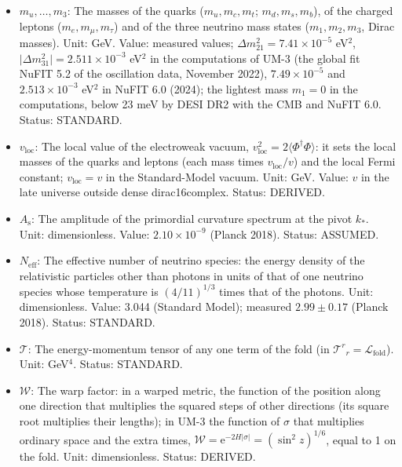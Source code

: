\documentclass[
  10pt,
]{article}
\begin{document}
\begin{itemize}
  space (the three components are equal); a repeated index is not summed
  unless a sum sign is written. Status: STANDARD.
\item
  \(m_u, \dots, m_3\): The masses of the quarks (\(m_u, m_c, m_t\);
  \(m_d, m_s, m_b\)), of the charged leptons (\(m_e, m_\mu, m_\tau\))
  and of the three neutrino mass states (\(m_1, m_2, m_3\), Dirac
  masses). Unit: GeV. Value: measured values;
  \(\Delta m_{21}^2 = 7.41\times10^{-5}\) eV\(^2\),
  \(\lvert\Delta m_{31}^2\rvert = 2.511\times10^{-3}\) eV\(^2\) in the
  computations of UM-3 (the global fit NuFIT 5.2 of the oscillation
  data, November 2022), \(7.49\times10^{-5}\) and \(2.513\times10^{-3}\)
  eV\(^2\) in NuFIT 6.0 (2024); the lightest mass \(m_1 = 0\) in the
  computations, below 23 meV by DESI DR2 with the CMB and NuFIT 6.0.
  Status: STANDARD.
\item
  \(v_{\mathrm{loc}}\): The local value of the electroweak vacuum,
  \(v_{\mathrm{loc}}^2 = 2\langle\Phi^\dagger\Phi\rangle\): it sets the
  local masses of the quarks and leptons (each mass times
  \(v_{\mathrm{loc}}/v\)) and the local Fermi constant;
  \(v_{\mathrm{loc}} = v\) in the Standard-Model vacuum. Unit: GeV.
  Value: \(v\) in the late universe outside dense dirac16complex.
  Status: DERIVED.
\item
  \(A_{\mathrm{s}}\): The amplitude of the primordial curvature spectrum
  at the pivot \(k_*\). Unit: dimensionless. Value:
  \(2.10\times10^{-9}\) (Planck 2018). Status: ASSUMED.
\item
  \(N_{\mathrm{eff}}\): The effective number of neutrino species: the
  energy density of the relativistic particles other than photons in
  units of that of one neutrino species whose temperature is
  \((4/11)^{1/3}\) times that of the photons. Unit: dimensionless.
  Value: 3.044 (Standard Model); measured \(2.99 \pm 0.17\) (Planck
  2018). Status: STANDARD.
\item
  \(\mathcal{T}\): The energy-momentum tensor of any one term of the
  fold (in \(\mathcal{T}^r{}_r = \mathcal{L}_{\mathrm{fold}}\)). Unit:
  GeV\(^4\). Status: STANDARD.
\item
  \(\mathcal{W}\): The warp factor: in a warped metric, the function of
  the position along one direction that multiplies the squared steps of
  other directions (its square root multiplies their lengths); in UM-3
  the function of \(\sigma\) that multiplies ordinary space and the
  extra times,
  \(\mathcal{W} = \mathrm{e}^{-2H\lvert\sigma\rvert} = (\sin^2z)^{1/6}\),
  equal to 1 on the fold. Unit: dimensionless. Status: DERIVED.

\end{itemize}
\end{document}
